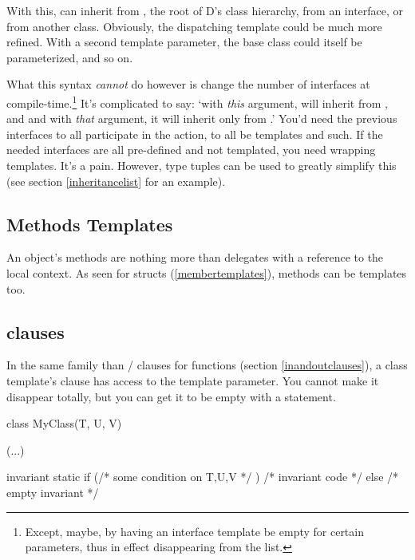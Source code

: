 With this,  can inherit from , the root of D's class hierarchy, from an interface, or from another class. Obviously, the dispatching template could be much more refined. With a second template parameter, the base class could itself be parameterized, and so on.

What this syntax \emph{cannot} do however is change the number of interfaces at compile-time.\footnote{ Except, maybe, by having an interface template be empty for certain parameters, thus in effect disappearing from the list.} It's complicated to say: `with \emph{this} argument,  will inherit from ,  and  and with \emph{that} argument, it will inherit only from .' You'd need the previous interfaces to all participate in the action, to all be templates and such. If the needed interfaces are all pre-defined and not templated, you need wrapping templates. It's a pain. However, type tuples can be used to greatly simplify this (see section \ref{inheritancelist} for an example).

\subsection{Methods Templates}\label{methodtemplates}

An object's methods are nothing more than delegates with a reference to the local  context. As seen for structs (\ref{membertemplates}), methods can be templates too.


\subsection{\texorpdfstring{ clauses}
                           {invariant clauses}}
\label{class:invariant}

In the same family than / clauses for functions (section \ref{inandoutclauses}), a class template's  clause has access to the template parameter. You cannot make it disappear totally, but you can get it to be empty with a  statement.

\begin{dcode}
class MyClass(T, U, V)
{
    (...)

    invariant
    {
        static if (/* some condition on T,U,V */ )
        {
            /* invariant code */
        }
        else
        { /* empty invariant */ }
    }
}
\end{dcode}

